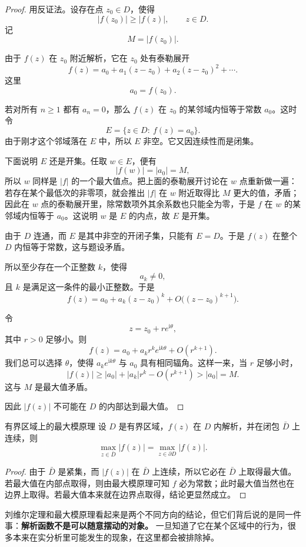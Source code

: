 \begin{proof}
用反证法。设存在点 $z_0\in D$，使得
\[
    |f(z_0)|\ge |f(z)|,\qquad z\in D.
\]
记
\[
    M=|f(z_0)|.
\]

由于 $f(z)$ 在 $z_0$ 附近解析，它在 $z_0$ 处有泰勒展开
\[
    f(z)=a_0+a_1(z-z_0)+a_2(z-z_0)^2+\cdots.
\]
这里
\[
    a_0=f(z_0).
\]

若对所有 $n\ge 1$ 都有 $a_n=0$，那么 $f(z)$ 在 $z_0$ 的某邻域内恒等于常数 $a_0$。这时令
\[
    E=\{z\in D:\ f(z)=a_0\}.
\]
由于刚才这个邻域落在 $E$ 中，所以 $E$ 非空。它又因连续性而是闭集。

下面说明 $E$ 还是开集。任取 $w\in E$，便有
\[
    |f(w)|=|a_0|=M,
\]
所以 $w$ 同样是 $|f|$ 的一个最大值点。把上面的泰勒展开讨论在 $w$ 点重新做一遍：若存在某个最低次的非零项，就会推出 $|f|$ 在 $w$ 附近取得比 $M$ 更大的值，矛盾；因此在 $w$ 点的泰勒展开里，除常数项外其余系数也只能全为零，于是 $f$ 在 $w$ 的某邻域内恒等于 $a_0$。这说明 $w$ 是 $E$ 的内点，故 $E$ 是开集。

由于 $D$ 连通，而 $E$ 是其中非空的开闭子集，只能有 $E=D$。于是 $f(z)$ 在整个 $D$ 内恒等于常数，这与题设矛盾。

所以至少存在一个正整数 $k$，使得
\[
    a_k\ne 0,
\]
且 $k$ 是满足这一条件的最小正整数。于是
\[
    f(z)=a_0+a_k(z-z_0)^k+O\bigl((z-z_0)^{k+1}\bigr).
\]

令
\[
    z=z_0+re^{\mathrm{i}\theta},
\]
其中 $r>0$ 足够小。则
\[
    f(z)=a_0+a_k r^k e^{\mathrm{i}k\theta}+O(r^{k+1}).
\]
我们总可以选择 $\theta$，使得 $a_k e^{\mathrm{i}k\theta}$ 与 $a_0$ 具有相同辐角。这样一来，当 $r$ 足够小时，
\[
    |f(z)|\ge |a_0|+|a_k|r^k-O(r^{k+1})>|a_0|=M.
\]
这与 $M$ 是最大值矛盾。

因此 $|f(z)|$ 不可能在 $D$ 的内部达到最大值。
\end{proof}

\begin{tuilun}{有界区域上的最大模原理}{}
设 $D$ 是有界区域，$f(z)$ 在 $D$ 内解析，并在闭包 $\bar D$ 上连续，则
\[
    \max_{z\in\bar D}|f(z)|=\max_{z\in\partial D}|f(z)|.
\]
\end{tuilun}

\begin{proof}
由于 $\bar D$ 是紧集，而 $|f(z)|$ 在 $\bar D$ 上连续，所以它必在 $\bar D$ 上取得最大值。若最大值在内部点取得，则由最大模原理可知 $f$ 必为常数；此时最大值当然也在边界上取得。若最大值本来就在边界点取得，结论更显然成立。
\end{proof}

\begin{zhu}{}{}
刘维尔定理和最大模原理看起来是两个不同方向的结论，但它们背后说的是同一件事：\textbf{解析函数不是可以随意摆动的对象。} 一旦知道了它在某个区域中的行为，很多本来在实分析里可能发生的现象，在这里都会被排除掉。
\end{zhu}

